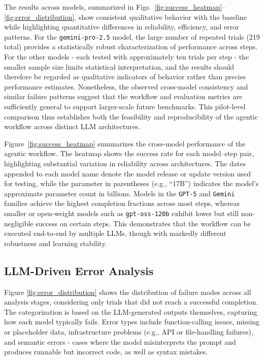 \documentclass[aps,prd,reprint,superscriptaddress]{revtex4-2}
\begin{document}
The results across models, summarized in Figs.~\ref{fig:success_heatmap}–\ref{fig:error_distribution}, show consistent qualitative behavior with the baseline while highlighting quantitative differences in reliability, efficiency, and error patterns. For the \texttt{gemini-pro-2.5} model, the large number of repeated trials (219 total) provides a statistically robust characterization of performance across steps. For the other models - each tested with approximately ten trials per step - the smaller sample size limits statistical interpretation, and the results should therefore be regarded as qualitative indicators of behavior rather than precise performance estimates. Nonetheless, the observed cross-model consistency and similar failure patterns suggest that the workflow and evaluation metrics are sufficiently general to support larger-scale future benchmarks. This pilot-level comparison thus establishes both the feasibility and reproducibility of the agentic workflow across distinct LLM architectures.

Figure~\ref{fig:success_heatmap} summarizes the cross-model performance of the agentic workflow. The heatmap shows the success rate for each model–step pair, highlighting substantial variation in reliability across architectures. The dates appended to each model name denote the model release or update version used for testing, while the parameter in parentheses (e.g., ``17B'') indicates the model’s approximate parameter count in billions. Models in the \texttt{GPT-5} and \texttt{Gemini} families achieve the highest completion fractions across most steps, whereas smaller or open-weight models such as \texttt{gpt-oss-120b} exhibit lower but still non-negligible success on certain steps.
This demonstrates that the workflow can be executed end-to-end by multiple LLMs, though with markedly different robustness and learning stability.

\subsection{LLM-Driven Error Analysis}
Figure \ref{fig:error_distribution} shows the distribution of failure modes across all analysis stages, considering only trials that did not reach a successful completion. The categorization is based on the LLM-generated outputs themselves, capturing how each model typically fails. Error types include function-calling issues, missing or placeholder data, infrastructure problems (e.g., API or file-handling failures), and semantic errors - cases where the model misinterprets the prompt and produces runnable but incorrect code, as well as syntax mistakes.
\end{document}
